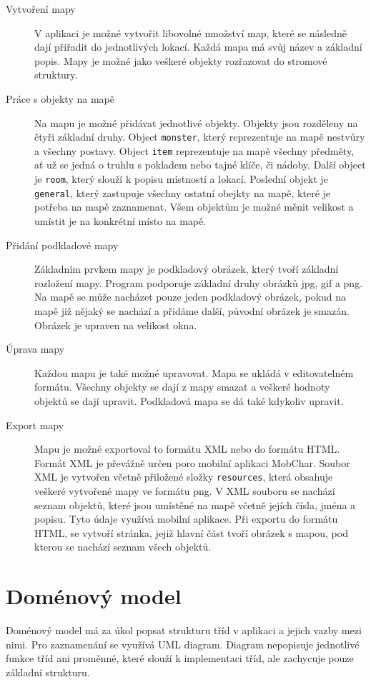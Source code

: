 \documentclass[thesis=B,czech]{resources/FITthesis}[2012/06/26]
\begin{document}
	\begin{description}
		\item[Vytvoření mapy]
V aplikaci je možné vytvořit libovolné množství map, které se následně dají přiřadit do jednotlivých lokací. Každá mapa má svůj název a základní popis. Mapy je možné jako veškeré objekty rozřazovat do stromové struktury. 

		\item[Práce s objekty na mapě]
Na mapu je možné přidávat jednotlivé objekty. Objekty jsou rozděleny na čtyři základní druhy. Object \texttt{monster}, který reprezentuje na mapě nestvůry a všechny postavy. Object \texttt{item} reprezentuje na mapě všechny předměty, ať už se jedná o truhlu s pokladem nebo tajné klíče, či nádoby. Další object je \texttt{room}, který slouží k popisu místností a lokací. Poslední objekt je \texttt{general}, který zastupuje všechny ostatní obejkty na mapě, které je potřeba na mapě zaznamenat. Všem objektům je možné měnit velikost a umístit je na konkrétní místo na mapě.

		\item[Přidání podkladové mapy]
Základním prvkem mapy je podkladový obrázek, který tvoří základní rozložení mapy. Program podporuje základní druhy obrázků jpg, gif a png. Na mapě se může nacházet pouze jeden podkladový obrázek, pokud na mapě již nějaký se nachází a přidáme další, původní obrázek je smazán. Obrázek je upraven na velikost okna.

		\item[Úprava mapy]
Každou mapu je také možné upravovat. Mapa se ukládá v editovatelném formátu. Všechny objekty se dají z mapy smazat a veškeré hodnoty objektů se dají upravit. Podkladová mapa se dá také kdykoliv upravit.  
		
		\item[Export mapy]
Mapu je možné exportoval to formátu XML nebo do formátu HTML. Formát XML je převážně určen poro mobilní aplikaci MobChar. Soubor XML je vytvořen včetně přiložené složky \texttt{resources}, která obsahuje veškeré vytvořené mapy ve formátu png. V XML souboru se nachází seznam objektů, které jsou umístěné na mapě včetně jejích čísla, jména a popisu. Tyto údaje využívá mobilní aplikace. Při exportu do formátu HTML, se vytvoří stránka, jejiž hlavní část tvoří obrázek s mapou, pod kterou se nachází seznam všech objektů.

	\end{description}
	\section{Doménový model}
Doménový model má za úkol popsat strukturu tříd v aplikaci a jejich vazby mezi nimi. Pro zaznamenání se využívá UML diagram. Diagram nepopisuje jednotlivé funkce tříd ani proměnné, které slouží k implementaci tříd, ale zachycuje pouze základní strukturu.
\end{document}
